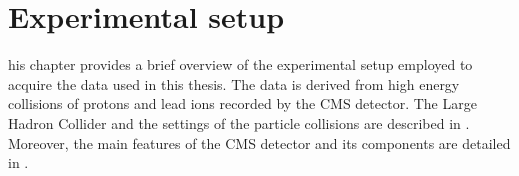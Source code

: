 \let\textcircled=\pgftextcircled
\chapter{Experimental setup} \label{sec:Experiment}

his chapter provides a brief overview of the experimental setup employed to acquire the data used in this thesis. The data is derived from high energy collisions of protons and lead ions  recorded by the CMS detector. The Large Hadron Collider and the settings of the particle collisions are described in . Moreover, the main features of the CMS detector and its components are detailed in .




\clearpage

